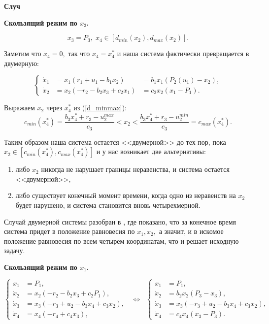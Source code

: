 \documentclass[11pt]{article}
\theoremstyle{definition}
\newcommand\Ref[1]{(\ref{#1})}
\newcommand\beq{\begin{equation}}
\newcommand\eeq{\end{equation}}
\begin{document}
%

{\bf Случ }


{\bf Скользящий режим по $x_3$.}

\beq
\label{d_minmax}
	x_3 = P_3, \; x_4 \in [d_{min}(x_2), d_{max}(x_2)].
\eeq

Заметим что $\dot x_4 = 0,$ так что $x_4 = x_4^*$ и наша система фактически превращается в двумерную:

$$
\left\{
\begin{aligned}
	\dot x_1 &= x_1(r_1 + u_1- b_1x_2) &= b_1x_1(P_2(u_1) - x_2), \\
	\dot x_2 &= x_2(-r_2 - b_2x_3 + c_2x_1) &= c_2x_2(x_1 - P_1).
\end{aligned}
\right.
$$

Выражаем $x_2$ через $x_4^*$ из \Ref{d_minmax}:
$$c_{min}(x_4^*) = \frac{b_3x_4^* + r_3 - u_2^{max}}{c_3} < x_2 < \frac{b_3x_4^* + r_3 - u_2^{min}}{c_3} = c_{max}(x_4^*).$$

Таким образом наша система остается <<двумерной>> до тех пор, пока $x_2 \in [c_{min}(x_4^*), c_{max}(x_4^*)]$ и у нас возникает две альтернативы:
\begin{enumerate}
	\item либо $x_2$ никогда не нарушает границы неравенства, и система остается <<двумерной>>,
	\item либо существует конечный момент времени, когда одно из неравенств на $x_2$ будет нарушено, и система становится вновь четырехмерной.
\end{enumerate}

Случай двумерной системы разобран в \cite{Ruble}, где показано, что за конечное время система придет в положение равновесия по $x_1, x_2,$ а значит, и в искомое положение равновесия по всем четырем координатам, что и решает исходную задачу.

{\bf Скользящий режим по $x_1$.}

\beq
\left\{
\begin{aligned}
	x_1 &= P_1, \\
	\dot x_2 &= x_2(-r_2 - b_2x_3 + c_2P_1), \\
	\dot x_3 &= x_3(-r_3 + u_2 - b_3x_4 + c_3x_2), \\
	\dot x_4 &= x_4(-r_4 + c_4x_3), 
\end{aligned}
\right. \;\; \Leftrightarrow \;\;
\left\{
\begin{aligned}
	x_1 &= P_1, \\
	\dot x_2 &= b_2x_2(P_3 - x_3), \\
	\dot x_3 &= x_3(-r_3 + u_2 - b_3x_4 + c_3x_2), \\
	\dot x_4 &= c_4x_4(x_3 - P_3). 	
\end{aligned}
\label{system1}
\right.
\eeq
\end{document}
